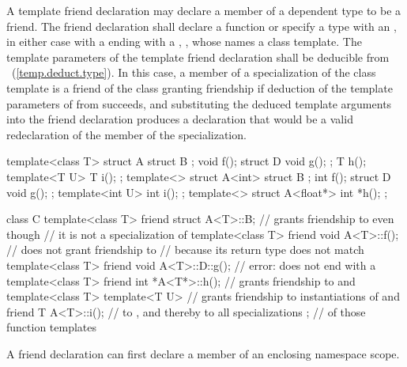 \pnum
A template friend declaration may declare
a member of a dependent type to be a friend.
The friend declaration shall declare a function or
specify a type with an ,
in either case with a 
ending with a , ,
whose  names a class template.
The template parameters of the template friend declaration
shall be deducible from ~(\ref{temp.deduct.type}).
In this case,
a member of a specialization  of the class template
is a friend of the class granting friendship
if deduction of the template parameters
of  from  succeeds, and
substituting the deduced template arguments into the friend declaration
produces a declaration that would be a valid redeclaration
of the member of the specialization.
\begin{example}
\begin{codeblock}
template<class T> struct A {
  struct B { };
  void f();
  struct D {
    void g();
  };
  T h();
  template<T U> T i();
};
template<> struct A<int> {
  struct B { };
  int f();
  struct D {
    void g();
  };
  template<int U> int i();
};
template<> struct A<float*> {
  int *h();
};

class C {
  template<class T> friend struct A<T>::B;      // grants friendship to  even though
                                                // it is not a specialization of 
  template<class T> friend void A<T>::f();      // does not grant friendship to 
                                                // because its return type does not match
  template<class T> friend void A<T>::D::g();   // error:  does not end with a 
  template<class T> friend int *A<T*>::h();     // grants friendship to  and 
  template<class T> template<T U>               // grants friendship to instantiations of  and
    friend T A<T>::i();                         // to , and thereby to all specializations
};                                              // of those function templates
\end{codeblock}
\end{example}

\pnum
\begin{note}
A friend declaration can first declare a member of an enclosing namespace scope.
\end{note}

